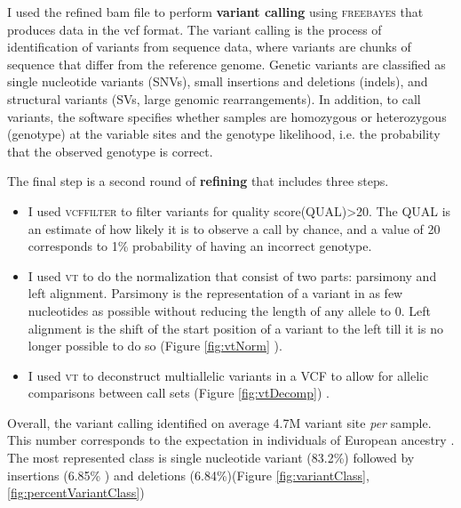 I used the refined bam file to perform \textbf{variant calling} using \textsc{freebayes} \cite{garrison2012haplotype} that produces data in the \gls{vcf} format. The variant calling is the process of identification of variants from sequence data, where variants are chunks of sequence that differ from the reference genome. Genetic variants are classified as single nucleotide variants (SNVs), small insertions and deletions (indels), and structural variants (SVs, large genomic rearrangements). In addition, to call variants, the software specifies whether samples are homozygous or heterozygous (genotype) at the variable sites and the \gls{genotype likelihood}, i.e. the probability that the observed genotype is correct. \newline

The final step is a second round of \textbf{refining} that includes three steps. 
\begin{itemize}
    \item I used \textsc{vcffilter} \cite{vcflib} to filter variants for \gls{quality score}(QUAL)>20. The QUAL is an estimate of how likely it is to observe a call by chance, and a value of 20 corresponds to 1\% probability of having an incorrect genotype.\\
    \item I used \textsc{vt} \cite{tan2015unified} to do the normalization that consist of two parts: parsimony and left alignment. Parsimony is the representation of a variant in as few nucleotides as possible without reducing the length of any allele to 0. Left alignment is the shift of the start position of a variant to the left till it is no longer possible to do so (Figure \ref{fig:vtNorm} \cite{tan2015unified}).\\



    \item I used \textsc{vt} to deconstruct multiallelic variants in a VCF to allow for allelic comparisons between call sets (Figure \ref{fig:vtDecomp}) \cite{tan2015unified}.\\
\end{itemize}

Overall, the variant calling identified on average 4.7M variant site \textit{per} sample. This number corresponds to the expectation in individuals of European ancestry \cite{1000genome2015global}. The most represented class is single nucleotide variant (83.2\%) followed by insertions (6.85\% ) and deletions (6.84\%)(Figure \ref{fig:variantClass}, \ref{fig:percentVariantClass})

